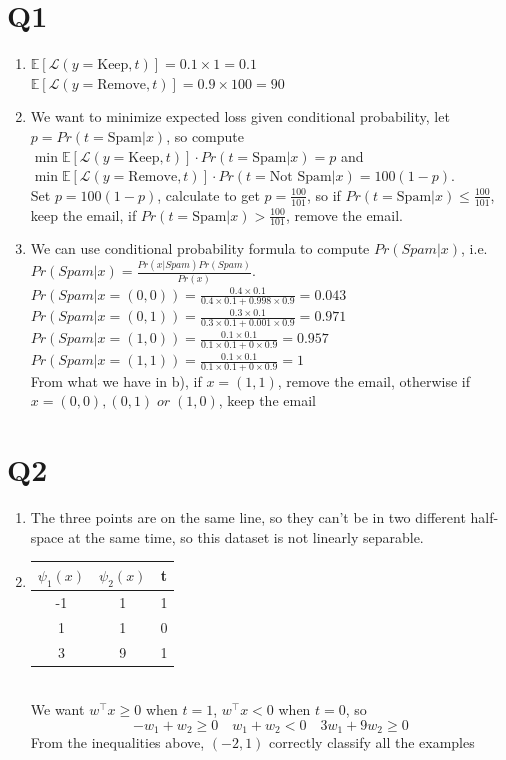 \documentclass[12pt]{article}
\begin{document}
	\section*{Q1}
	\begin{enumerate}[label=\alph*)]
		\item $\mathbb{E}[\mathcal{L}(y=\text{Keep},t)]=0.1\times 1=0.1$\\
		$\mathbb{E}[\mathcal{L}(y=\text{Remove},t)]=0.9\times 100=90$
		\item We want to minimize expected loss given conditional probability, let $p=Pr(t=\text{Spam}|x)$, so compute $\min\mathbb{E}[\mathcal{L}(y=\text{Keep},t)]\cdot Pr(t=\text{Spam}|x)=p$ and $\min\mathbb{E}[\mathcal{L}(y=\text{Remove},t)]\cdot Pr(t=\text{Not Spam}|x)=100(1-p)$.\\
		Set $p=100(1-p)$, calculate to get $p=\frac{100}{101}$, so if $Pr(t=\text{Spam}|x)\leq\frac{100}{101}$, keep the email, if $Pr(t=\text{Spam}|x)>\frac{100}{101}$, remove the email.
		\item We can use conditional probability formula to compute $Pr(Spam|x)$, i.e. $Pr(Spam|x)=\frac{Pr(x|Spam)Pr(Spam)}{Pr(x)}$.\\
		$Pr(Spam|x=(0,0))=\frac{0.4\times0.1}{0.4\times0.1+0.998\times0.9}=0.043$\\
		$Pr(Spam|x=(0,1))=\frac{0.3\times0.1}{0.3\times0.1+0.001\times0.9}=0.971$\\
		$Pr(Spam|x=(1,0))=\frac{0.1\times0.1}{0.1\times0.1+0\times0.9}=0.957$\\
		$Pr(Spam|x=(1,1))=\frac{0.1\times0.1}{0.1\times0.1+0\times0.9}=1$\\
		From what we have in b), if $x=(1,1)$, remove the email, otherwise if $x=(0,0),(0,1)\;or\;(1,0)$, keep the email
	\end{enumerate}
		
	\newpage
	
	\section*{Q2}
	\begin{enumerate} [label=\alph*)]
		\item The three points are on the same line, so they can't be in two different half-space at the same time, so this dataset is not linearly separable.
		\item \begin{tabular}{c|c|c}
			$\psi_1(x)$ & $\psi_2(x)$ & t \\
			\hline
			-1 & 1 & 1 \\
			1 & 1 & 0 \\
			3 & 9 & 1 \\
		\end{tabular} \\
		We want $w^\top x\geq0$ when $t=1$, $w^\top x<0$ when $t=0$, so \[-w_1+w_2\geq0\quad w_1+w_2<0\quad3w_1+9w_2\geq0\]
		From the inequalities above, $(-2,1)$ correctly classify all the examples
	\end{enumerate}
	\newpage
	
\end{document}
